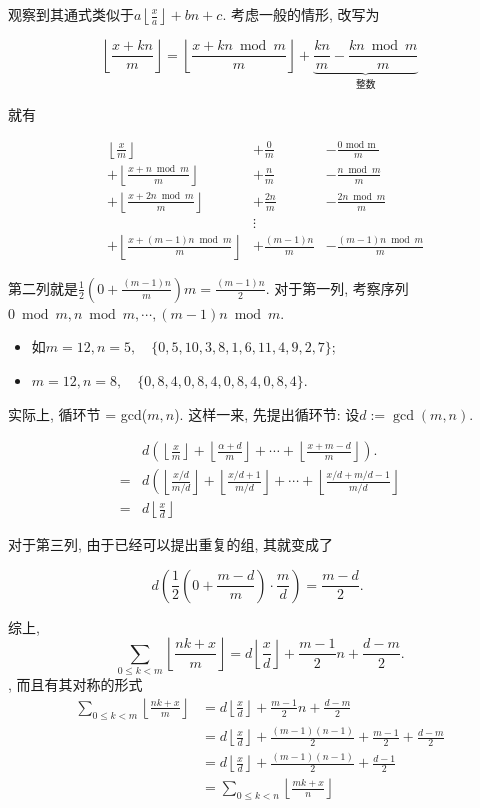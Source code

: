 \documentclass{ctexart}
\begin{document}
观察到其通式类似于$a\left\lfloor\frac{x}{a}\right\rfloor+b n+c$. 考虑一般的情形, 改写为

$$\left\lfloor\frac{x+k n}{m}\right\rfloor=\left\lfloor\frac{x+k n \bmod m}{m}\right\rfloor+\underbrace{\frac{k n}{m}-\frac{k n \bmod m}{m}}_{\text {整数}}$$

就有


$$
\begin{array}{cccc}
&\left\lfloor\frac{x}{m}\right\rfloor&+\frac{0}{m}&-\frac{0\text { mod m }}{m} \\
&+\left\lfloor\frac{x+n \bmod m}{m}\right\rfloor&+\frac{n}{m}&-\frac{n \bmod m}{m} \\
&+\left\lfloor\frac{x+2 n \bmod m}{m}\right\rfloor&+\frac{2 n}{m}&-\frac{2 n \bmod m}{m} \\
&&\vdots& \\
&+\left\lfloor\frac{x+(m-1) n \bmod m}{m}\right\rfloor&+\frac{(m-1) n}{m}&-\frac{(m-1) n \bmod m}{m}
\end{array}
$$
    
第二列就是$\frac{1}{2}\left(0+\frac{(m-1) n}{m}\right) m=\frac{(m-1) n}{2}$. 对于第一列, 考察序列$0 \bmod m, n \bmod m, \cdots,(m-1) n \bmod m$.

\begin{itemize}
    \item 如$m=12, n=5, \quad\{0,5,10,3,8,1,6,11,4,9,2,7\}$;
    \item $m=12, n=8, \quad\{0,8,4,0,8,4,0,8,4,0,8,4\}$.
\end{itemize}

实际上, 循环节 = gcd($m,n$). 这样一来, 先提出循环节: 设$d:=\operatorname{gcd}(m, n)$.

$$
\begin{aligned}
& d\left(\left\lfloor\frac{x}{m}\right\rfloor+\left\lfloor\frac{\alpha+d}{m}\right\rfloor+\cdots+\left\lfloor\frac{x+m-d}{m}\right\rfloor\right) . \\
= & d\left(\left\lfloor\frac{x / d}{m / d}\right\rfloor+\left\lfloor\frac{x / d+1}{m / d}\right\rfloor+\cdots+\left\lfloor\frac{x / d+m / d-1}{m / d}\right\rfloor\right. \\
= & d\left\lfloor\frac{x}{d}\right\rfloor
\end{aligned}
$$

对于第三列, 由于已经可以提出重复的组, 其就变成了

$$
d\left(\frac{1}{2}\left(0+\frac{m-d}{m}\right) \cdot \frac{m}{d}\right)=\frac{m-d}{2} \text {. }
$$

综上, $$
\sum_{0 \leq k<m}\left\lfloor\frac{n k+x}{m}\right\rfloor=d\left\lfloor\frac{x}{d}\right\rfloor+\frac{m-1}{2} n+\frac{d-m}{2} .
$$, 而且有其对称的形式
$$
\begin{aligned}
\sum_{0 \leq k<m}\left\lfloor\frac{n k+x}{m}\right\rfloor & =d\left\lfloor\frac{x}{d}\right\rfloor+\frac{m-1}{2} n+\frac{d-m}{2} \\
& =d\left\lfloor\frac{x}{d}\right\rfloor+\frac{(m-1)(n-1)}{2}+\frac{m-1}{2}+\frac{d-m}{2} \\
& =d\left\lfloor\frac{x}{d}\right\rfloor+\frac{(m-1)(n-1)}{2}+\frac{d-1}{2} \\
& =\sum_{0 \leq k<n}\left\lfloor\frac{m k+x}{n}\right\rfloor
\end{aligned}
$$
\end{document}
